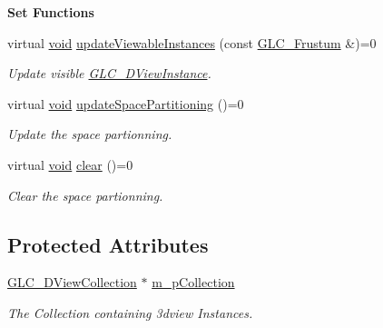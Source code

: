 \begin{Indent}{\bf Set Functions}\par
\begin{DoxyCompactItemize}
\item 
virtual \hyperlink{group___u_a_v_objects_plugin_ga444cf2ff3f0ecbe028adce838d373f5c}{void} \hyperlink{class_g_l_c___space_partitioning_aca395c76ba881cd9c96310b59dc1b51a}{update\-Viewable\-Instances} (const \hyperlink{class_g_l_c___frustum}{G\-L\-C\-\_\-\-Frustum} \&)=0
\begin{DoxyCompactList}\small\item\em Update visible \hyperlink{class_g_l_c__3_d_view_instance}{G\-L\-C\-\_\-D\-View\-Instance}. \end{DoxyCompactList}\item 
virtual \hyperlink{group___u_a_v_objects_plugin_ga444cf2ff3f0ecbe028adce838d373f5c}{void} \hyperlink{class_g_l_c___space_partitioning_a76c007aed6e6fd91a1d078402e39594a}{update\-Space\-Partitioning} ()=0
\begin{DoxyCompactList}\small\item\em Update the space partionning. \end{DoxyCompactList}\item 
virtual \hyperlink{group___u_a_v_objects_plugin_ga444cf2ff3f0ecbe028adce838d373f5c}{void} \hyperlink{class_g_l_c___space_partitioning_a39831ff6f807ad86f34fa8fe63de62e7}{clear} ()=0
\begin{DoxyCompactList}\small\item\em Clear the space partionning. \end{DoxyCompactList}\end{DoxyCompactItemize}
\end{Indent}
\subsection*{Protected Attributes}
\begin{DoxyCompactItemize}
\item 
\hyperlink{class_g_l_c__3_d_view_collection}{G\-L\-C\-\_\-D\-View\-Collection} $\ast$ \hyperlink{class_g_l_c___space_partitioning_a0bb65cbb45559bcec79bfa32c8f261a9}{m\-\_\-p\-Collection}
\begin{DoxyCompactList}\small\item\em The Collection containing 3dview Instances. \end{DoxyCompactList}\end{DoxyCompactItemize}


